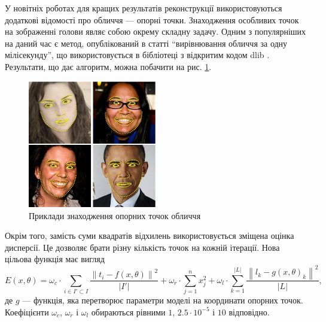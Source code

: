 У новітніх роботах для кращих результатів реконструкції використовуються
додаткові відомості про обличчя --- опорні точки.
Знаходження особливих точок на зображенні голови
являє собою окрему складну задачу.
Одним з популярніших на даний час є метод, опублікований в статті
``вирівнювання обличчя за одну мілісекунду'',
що використовується в бібліотеці з відкритим кодом dlib \cite{Kazemi:2014}.
Результати, що дає алгоритм, можна побачити на рис. \ref{fig:problems:dlib}.
\begin{figure}[h]
  \centering
    \includegraphics[width=0.5\textwidth]{images/dlib}
  \caption{Приклади знаходження опорних точок обличчя}
  \label{fig:problems:dlib}
\end{figure}

Окрім того,
замість суми квадратів відхилень використовується зміщена оцінка дисперсії.
Це дозволяє брати різну кількість точок на кожній ітерації.
Нова цільова функція має вигляд
\begin{equation}\label{eq:energy:face2face}
  E\left( x, \theta \right)
  = \omega_c \cdot \sum_{i \in I' \subset I}
      \frac{\left\| t_i - f\left( x, \theta \right) \right\|^2}
           {\left| I' \right|}
  + \omega_r \cdot \sum_{j = 1}^{n} x_j^2
  + \omega_l \cdot \sum_{k = 1}^{\left| L \right|}
    \frac{\left\| l_k - g\left( x, \theta \right)_k \right\|^2}
         {\left| L \right|},
\end{equation}
де $g$ --- функція, яка перетворює параметри моделі на координати опорних точок.
Коефіцієнти $\omega_c$, $\omega_r$ і $\omega_l$
обираються рівними $1$, $2.5 \cdot 10^{-5}$ і $10$ відповідно.
